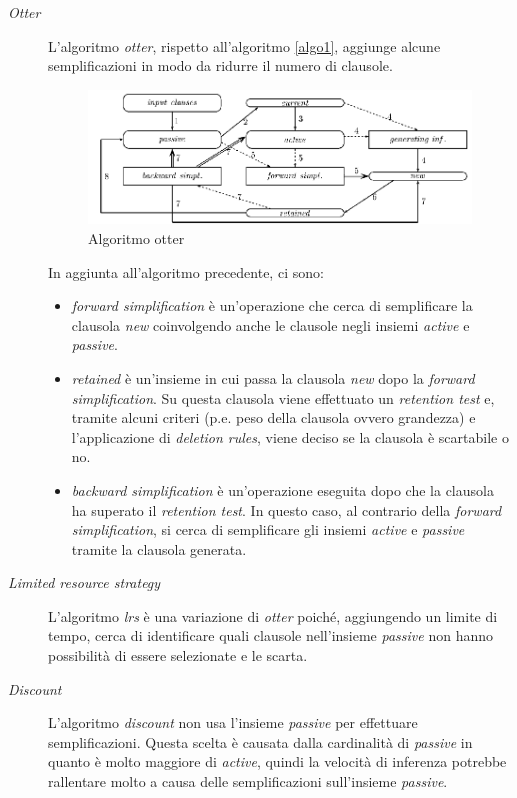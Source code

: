 \begin{description}
    \item[\emph{Otter}] L'algoritmo \emph{otter}, rispetto all'algoritmo \ref{algo1}, aggiunge alcune semplificazioni in modo da ridurre il numero di clausole.
    \begin{figure}[H]
        \centering
        \includegraphics[width=\columnwidth]{figures/otter.png}
        \caption{Algoritmo otter \cite{riazanov2002design}}
    \end{figure}
    In aggiunta all'algoritmo precedente, ci sono:
    \begin{itemize}
        \item \emph{forward simplification} è un'operazione che cerca di semplificare la clausola \emph{new} coinvolgendo anche 
        le clausole negli insiemi \emph{active} e \emph{passive}.
        \item \emph{retained} è un'insieme in cui passa la clausola \emph{new} dopo la \emph{forward simplification}. Su questa clausola viene effettuato un 
        \emph{retention test} e, tramite alcuni criteri (p.e. peso della clausola ovvero grandezza) e l'applicazione di \emph{deletion rules}, viene deciso se la clausola 
        è scartabile o no.
        \item \emph{backward simplification} è un'operazione eseguita dopo che la clausola ha superato il \emph{retention test}. In questo caso, al contrario della \emph{forward simplification}, 
        si cerca di semplificare gli insiemi \emph{active} e \emph{passive} tramite la clausola generata.
    \end{itemize}
    \item[\emph{Limited resource strategy}] L'algoritmo \emph{lrs} è una variazione di \emph{otter} poiché, aggiungendo un limite di tempo,
    cerca di identificare quali clausole nell'insieme \emph{passive} non hanno possibilità di essere selezionate e le scarta.
    \item[\emph{Discount}] L'algoritmo \emph{discount} non usa l'insieme \emph{passive} per effettuare semplificazioni. Questa scelta è causata dalla cardinalità di \emph{passive} in quanto è molto maggiore di \emph{active},
    quindi la velocità di inferenza potrebbe rallentare molto a causa delle semplificazioni sull'insieme \emph{passive}. 
\end{description}

